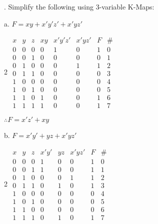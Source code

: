 \documentclass[12pt]{book}
\newenvironment{indented}[1] {
	\begin{list}{}{\setlength{\leftmargin}{#1}}
		\item[]
	}{\end{list}}
\begin{document}
	. Simplify the following using 3-variable K-Maps:
	\begin{indented}{5mm}
		a. $F = xy + x'y'z' + x'yz'$
		\begin{indented}{5mm}
			\begin{multicols}{2}
				$\begin{array}{c|c|c|c|c|c|c|c}
					x & y & z & xy & x'y'z' & x'yz' & F & \#\\
					\hline
					0 & 0 & 0 & 0 & 1 & 0 & 1 & 0 \\
					0 & 0 & 1 & 0 & 0 & 0 & 0 & 1 \\
					0 & 1 & 0 & 0 & 0 & 1 & 1 & 2 \\
					0 & 1 & 1 & 0 & 0 & 0 & 0 & 3 \\
					1 & 0 & 0 & 0 & 0 & 0 & 0 & 4 \\
					1 & 0 & 1 & 0 & 0 & 0 & 0 & 5 \\
					1 & 1 & 0 & 1 & 0 & 0 & 1 & 6 \\
					1 & 1 & 1 & 1 & 0 & 0 & 1 & 7
				\end{array}$
				\columnbreak

				\begin{karnaugh-map}[4][2][1][yz][x]

				\end{karnaugh-map}
			\end{multicols}
			$\therefore F = x'z' + xy$
		\end{indented}

		\pagebreak
		b. $F = x'y' + yz + x'yz'$
		\begin{indented}{5mm}
			\begin{multicols}{2}
				$\begin{array}{c|c|c|c|c|c|c|c}
					x & y & z & x'y' & yz & x'yz' & F & \#\\
					\hline
					0 & 0 & 0 & 1 & 0 & 0 & 1 & 0 \\
					0 & 0 & 1 & 1 & 0 & 0 & 1 & 1 \\
					0 & 1 & 0 & 0 & 0 & 1 & 1 & 2 \\
					0 & 1 & 1 & 0 & 1 & 0 & 1 & 3 \\
					1 & 0 & 0 & 0 & 0 & 0 & 0 & 4 \\
					1 & 0 & 1 & 0 & 0 & 0 & 0 & 5 \\
					1 & 1 & 0 & 0 & 0 & 0 & 0 & 6 \\
					1 & 1 & 1 & 0 & 1 & 0 & 1 & 7
				\end{array}$
				\columnbreak


\end{multicols}
\end{indented}
\end{indented}
\end{document}
